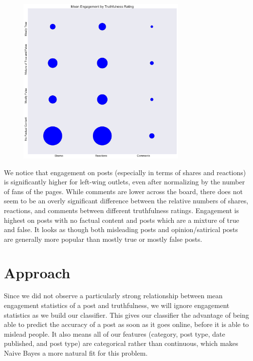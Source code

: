 \documentclass[12pt]{article}
\begin{document}
\begin{figure}[H] 
    \centering
    \includegraphics[width=0.75\textwidth]{engagement_by_truthfulness.png}
\end{figure}

We notice that engagement on posts (especially in terms of shares and reactions) is significantly higher for left-wing outlets, even after normalizing by the number of fans of the pages. While comments are lower across the board, there does not seem to be an overly significant difference between the relative numbers of shares, reactions, and comments between different truthfulness ratings.  Engagement is highest on posts with no factual content and posts which are a mixture of true and false. It looks as though both misleading posts and opinion/satirical posts are generally more popular than mostly true or mostly false posts.

\section*{Approach}

Since we did not observe a particularly strong relationship between mean engagement statistics of a post and truthfulness, we will ignore engagement statistics as we build our classifier. This gives our classifier the advantage of being able to predict the accuracy of a post as soon as it goes online, before it is able to mislead people. It also means all of our features (category, post type, date published, and post type) are categorical rather than continuous, which makes Naive Bayes a more natural fit for this problem. 
\end{document}
